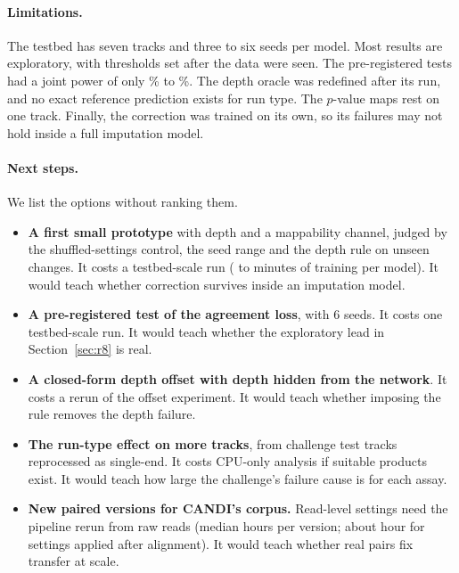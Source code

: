 \documentclass[pdflatex,sn-mathphys-num]{sn-jnl}
\newcommand{\lit}[1]{#1}
\begin{document}
\paragraph{Limitations.} The testbed has seven tracks and three to six seeds per model. Most
results are exploratory, with thresholds set after the data were seen. The pre-registered tests
had a joint power of only \powJoint\% to \powPivot\%. The depth oracle was redefined after its
run, and no exact reference prediction exists for run type. The $p$-value maps rest on one track. Finally, the
correction was trained on its own, so its failures may not hold inside a full imputation model.

\paragraph{Next steps.} We list the options without ranking them.
\begin{itemize}
\item \textbf{A first small prototype} with depth and a mappability channel, judged by the
shuffled-settings control, the seed range and the depth rule on unseen changes. It costs a
testbed-scale run (\costTrLo{} to \costTrHi{} minutes of training per model). It would teach
whether correction survives inside an imputation model.
\item \textbf{A pre-registered test of the agreement loss}, with \lit{6} seeds. It costs one
testbed-scale run. It would teach whether the exploratory lead in Section~\ref{sec:r8} is real.
\item \textbf{A closed-form depth offset with depth hidden from the network}. It costs a rerun
of the offset experiment. It would teach whether imposing the rule removes the depth failure.
\item \textbf{The run-type effect on more tracks}, from challenge test tracks reprocessed as
single-end. It costs CPU-only analysis if suitable products exist. It would teach how large the
challenge's failure cause is for each assay.
\item \textbf{New paired versions for CANDI's corpus.} Read-level settings need the pipeline
rerun from raw reads (median \costFastq{} hours per version; about \costBam{} hour for settings
applied after alignment). It would teach whether real pairs fix transfer at scale.
\end{itemize}

\backmatter

\end{document}
